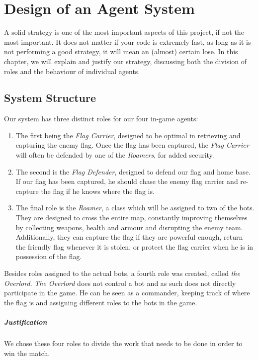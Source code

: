 \chapter{Design of an Agent System}

A solid strategy is one of the most important aspects of this project, if not the most important. It does not matter if your code is extremely fast, as long as it is not performing a good strategy, it will mean an (almost) certain lose. In this chapter, we will explain and justify our strategy, discussing both the division of roles and the behaviour of individual agents.

\section{System Structure}
Our system has three distinct roles for our four in-game agents:

\begin{enumerate}
\item The first being the \emph{Flag Carrier}, designed to be optimal in retrieving and capturing the enemy flag. Once the flag has been captured, the \emph{ Flag Carrier} will often be defended by one of the \emph{Roamers}, for added security.

\item The second is the \emph{Flag Defender}, designed to defend our flag and home base. If our flag has been captured, he should chase the enemy flag carrier and re-capture the flag if he knows where the flag is. 

\item The final role is the \emph{Roamer}, a class which will be assigned to two of the bots. They are designed to cross the entire map, constantly improving themselves by collecting weapons, health and armour and disrupting the enemy team. Additionally, they can capture the flag if they are powerful enough, return the friendly flag whenever it is stolen, or protect the flag carrier when he is in possession of the flag.
\end{enumerate}

Besides roles assigned to the actual bots, a fourth role was created, called \emph{the Overlord}. \emph{The Overlord} does not control a bot and as such does not directly participate in the game. He can be seen as a commander, keeping track of where the flag is and assigning different roles to the bots in the game.\\

\paragraph{Justification}
We chose these four roles to divide the work that needs to be done in order to win the match.

